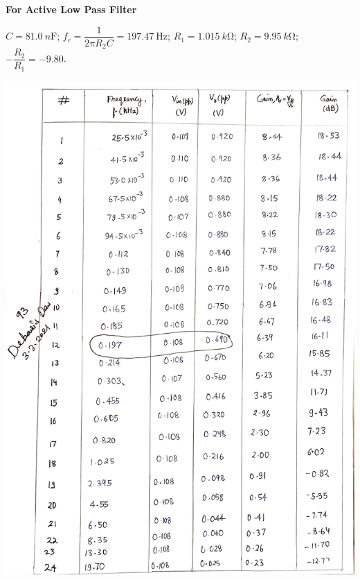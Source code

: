 \clearpage
\begin{center}
    \textbf{For Active Low Pass Filter}
\end{center}
$C = \SI{81.0}{n \farad}$; $f_{c} = \dfrac{1}{2 \pi R_2 C} = \SI{197.47}{\hertz}$; $R_1 = \SI{1.015}{k\ohm}$; $R_2 = \SI{9.95}{k\ohm}$; $-\dfrac{R_2}{R_1} = -9.80$.
\begin{center}
    \includegraphics[scale = 0.25]{Documents/table.jpg}
\end{center}
